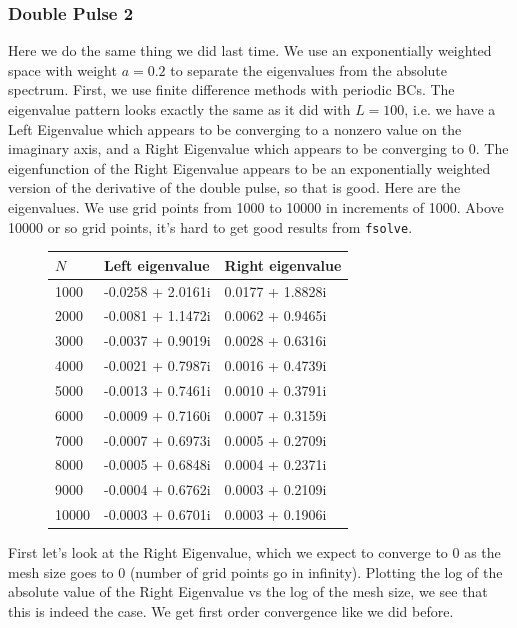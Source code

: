 \documentclass[12pt]{article}
\begin{document}
\subsubsection*{Double Pulse 2}
Here we do the same thing we did last time. We use an exponentially weighted space with weight $a = 0.2$ to separate the eigenvalues from the absolute spectrum. First, we use finite difference methods with periodic BCs. The eigenvalue pattern looks exactly the same as it did with $L = 100$, i.e. we have a Left Eigenvalue which appears to be converging to a nonzero value on the imaginary axis, and a Right Eigenvalue which appears to be converging to 0. The eigenfunction of the Right Eigenvalue appears to be an exponentially weighted version of the derivative of the double pulse, so that is good. Here are the eigenvalues. We use grid points from 1000 to 10000 in increments of 1000. Above 10000 or so grid points, it's hard to get good results from \texttt{fsolve}.

\begin{figure}[H]
\begin{tabular}{l|ll}
$N$    & Left eigenvalue      &  Right eigenvalue    \\ \hline
  1000 &   -0.0258 + 2.0161i  &    0.0177 + 1.8828i  \\ 
  2000 &   -0.0081 + 1.1472i  &    0.0062 + 0.9465i  \\ 
  3000 &   -0.0037 + 0.9019i  &    0.0028 + 0.6316i  \\ 
  4000 &   -0.0021 + 0.7987i  &    0.0016 + 0.4739i  \\
  5000 &   -0.0013 + 0.7461i  &    0.0010 + 0.3791i  \\ 
  6000 &   -0.0009 + 0.7160i  &    0.0007 + 0.3159i  \\ 
  7000 &   -0.0007 + 0.6973i  &    0.0005 + 0.2709i  \\ 
  8000 &   -0.0005 + 0.6848i  &    0.0004 + 0.2371i  \\ 
  9000 &   -0.0004 + 0.6762i  &    0.0003 + 0.2109i  \\
 10000 &   -0.0003 + 0.6701i  &    0.0003 + 0.1906i  \\ 
\end{tabular}
\end{figure}
First let's look at the Right Eigenvalue, which we expect to converge to 0 as the mesh size goes to 0 (number of grid points go in infinity). Plotting the log of the absolute value of the Right Eigenvalue vs the log of the mesh size, we see that this is indeed the case. We get first order convergence like we did before.
\end{document}
